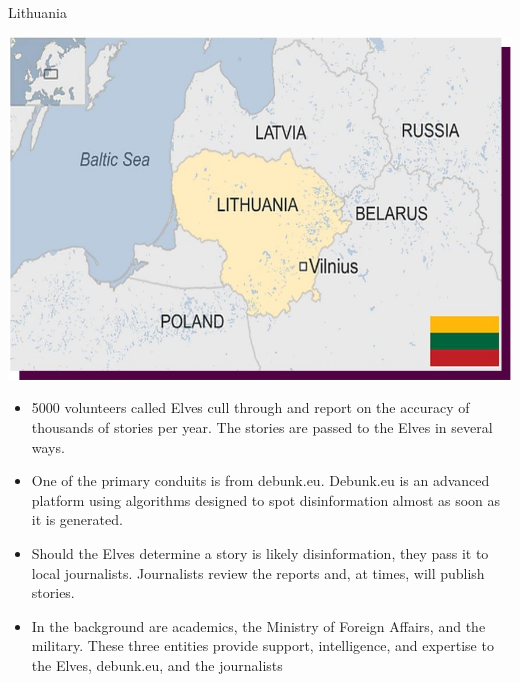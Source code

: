 \documentclass[nobackground,dvipsnames,table]{beamer}
\begin{document}
\begin{frame}{Lithuania}
\begin{minipage}{\textwidth}
    \centering \includegraphics[scale=.35]{img/fig17.jpg}
\end{minipage}

\begin{minipage}{\textwidth}
    \footnotesize{
    \begin{itemize}
        \item 5000 volunteers called Elves cull through and report on the accuracy of thousands of stories per year.  The stories are passed to the Elves in several ways.
        \item One of the primary conduits is from debunk.eu.  Debunk.eu is an advanced platform using algorithms designed to spot disinformation almost as soon as it is generated. 
        \item Should the Elves determine a story is likely disinformation, they pass it to local journalists.  Journalists review the reports and, at times, will publish stories.
        \item In the background are academics, the Ministry of Foreign Affairs, and the military.  These three entities provide support, intelligence, and expertise to the Elves, debunk.eu, and the journalists
    \end{itemize}
    }
\end{minipage}

\end{frame}
\end{document}
